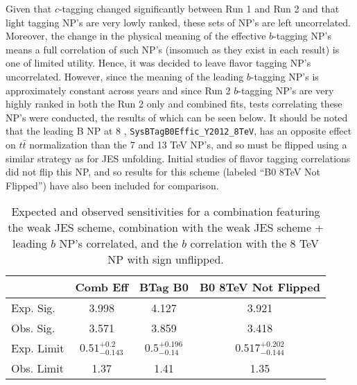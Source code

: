Given that $c$-tagging changed significantly between Run 1 and Run 2 and that light tagging NP's are very lowly ranked, these sets of NP's are left uncorrelated.  Moreover, the change in the physical meaning of the effective $b$-tagging NP's means a full correlation of such NP's (insomuch as they exist in each result) is one of limited utility.  Hence, it was decided to leave flavor tagging NP's uncorrelated.  However, since the meaning of the leading $b$-tagging NP's is approximately constant across years and since Run 2 $b$-tagging NP's are very highly ranked in both the Run 2 only and combined fits, tests correlating these NP's were conducted, the results of which can be seen below.  It should be noted that the leading B NP at 8 \TeV, \texttt{SysBTagB0Effic\_Y2012\_8TeV}, has an opposite effect on $t\bar{t}$ normalization than the 7 and 13 TeV NP's, and so must be flipped using a similar strategy as for JES unfolding.  Initial studies of flavor tagging correlations did not flip this NP, and so results for this scheme (labeled ``B0 8TeV Not Flipped'') have also been included for comparison.

\begin{table}[htbp]
\caption{Expected and observed sensitivities for a combination featuring the weak JES scheme, combination with the weak JES scheme + leading $b$ NP's correlated, and the $b$ correlation with the 8 TeV NP with sign unflipped.}
\begin{center}\begin{tabular}{lccc}
\hline\hline
 & Comb Eff & BTag B0 & B0 8TeV Not Flipped\\
\hline
Exp. Sig. & 3.998 & 4.127 & 3.921\\
Obs. Sig. &  3.571 & 3.859 & 3.418\\ %
\hline
Exp. Limit & $0.51^{+0.2}_{-0.143}$ & $0.5^{+0.196}_{-0.14}$ & $0.517^{+0.202}_{-0.144}$\\
Obs. Limit & 1.37 & 1.41 & 1.35\\
\hline
\end{tabular}
\label{tab:ExpectedSensitivities:btag-b}
\end{center}
\end{table}

